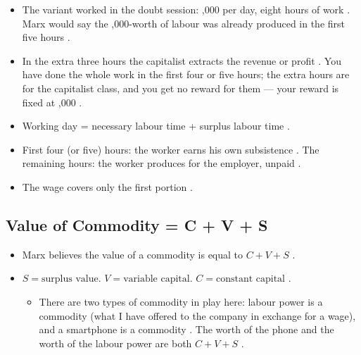 \begin{ExampleBox}
\begin{itemize}
    \item The variant worked in the doubt session: ,000 per day, eight hours of work . Marx would say the ,000-worth of labour was already produced in the first five hours .
    \item In the extra three hours the capitalist extracts the revenue or profit . You have done the whole work in the first four or five hours; the extra hours are for the capitalist class, and you get no reward for them --- your reward is fixed at ,000 .
\end{itemize}
\end{ExampleBox}

\begin{QuickRevision}
\begin{itemize}
    \item Working day = necessary labour time + surplus labour time .
    \item First four (or five) hours: the worker earns his own subsistence . The remaining hours: the worker produces for the employer, unpaid .
    \item The wage covers only the first portion .
\end{itemize}
\end{QuickRevision}

\subsection{Value of Commodity = C + V + S}
\begin{itemize}
    \item Marx believes the value of a commodity is equal to $C + V + S$ .
    \item $S = \text{surplus value}$. $V = \text{variable capital}$. $C = \text{constant capital}$ .
    \begin{itemize}
        \item There are two types of commodity in play here: labour power is a commodity (what I have offered to the company in exchange for a wage), and a smartphone is a commodity . The worth of the phone and the worth of the labour power are both $C + V + S$ .
    \end{itemize}
\end{itemize}

